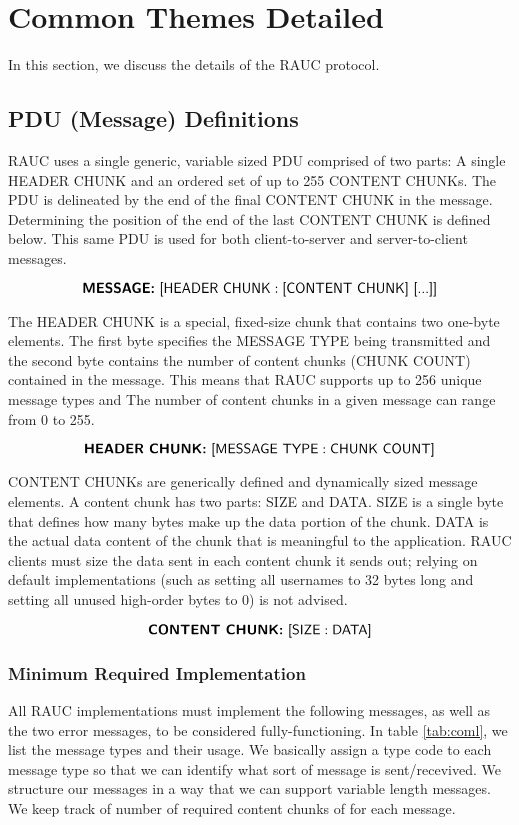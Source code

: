 \section{Common Themes Detailed}
\label{sec:ct}

In this section, we discuss the details of the \textsf{RAUC} protocol.

\subsection{PDU (Message) Definitions}
\label{sec:pdudef}
RAUC uses a single generic, variable sized PDU comprised of two parts: A single HEADER CHUNK and an ordered set of up to 255 CONTENT CHUNKs. The PDU is delineated by the end of the final CONTENT CHUNK in the message. Determining the position of the end of the last CONTENT CHUNK is defined below. This same PDU is used for both client-to-server and server-to-client messages.

\[\textsf{\textbf{MESSAGE:} [HEADER CHUNK} : \textsf{[CONTENT CHUNK] [...]]}\]

The HEADER CHUNK is a special, fixed-size chunk that contains two one-byte elements. The first byte specifies the MESSAGE TYPE being transmitted and the second byte contains the number of content chunks (CHUNK COUNT) contained in the message. This means that RAUC supports up to 256 unique message types and The number of content chunks in a given message can range from 0 to 255.

\[\textsf{\textbf{HEADER CHUNK:} [MESSAGE TYPE} : \textsf{CHUNK COUNT]}\]

CONTENT CHUNKs are generically defined and dynamically sized message elements. A content chunk has two parts: SIZE and DATA. SIZE is a single byte that defines how many bytes make up the data portion of the chunk. DATA is the actual data content of the chunk that is meaningful to the application. RAUC clients must size the data sent in each content chunk it sends out; relying on default implementations (such as setting all usernames to 32 bytes long and setting all unused high-order bytes to 0) is not advised.

\[\textsf{\textbf{CONTENT CHUNK:} [SIZE} : \textsf{DATA]}\]



\subsubsection{Minimum Required Implementation}
All RAUC implementations must implement the following  messages, as well as the two error messages, to be considered fully-functioning. In table \ref{tab:coml}, we list the message types and their usage. We basically assign a type code to each message type so that we can identify what sort of message is sent/recevived. We structure our messages in a way that we can support variable length messages. We keep track of number of required content chunks of for each message. 

